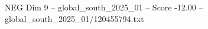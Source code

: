 \begin{textsample}{NEG Dim 9 – global\_south\_2025\_01 – Score -12.00 – global\_south\_2025\_01/120455794.txt}
\end{textsample}
